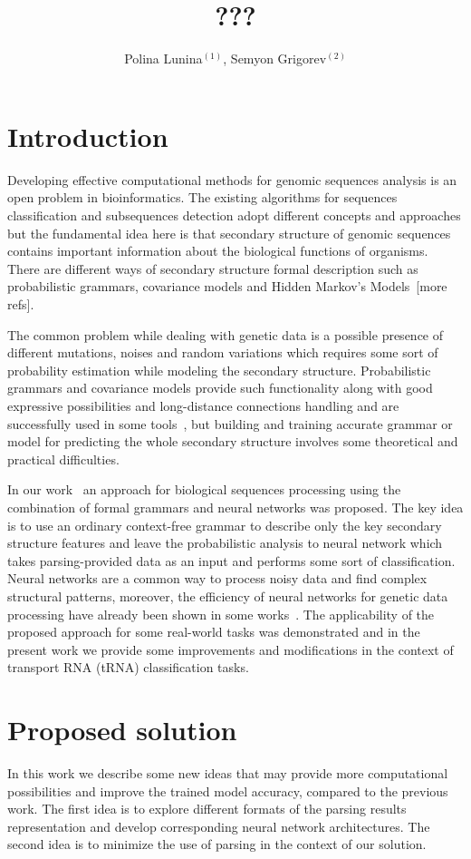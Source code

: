 \documentclass[12pt,a4paper]{cibb}
\title{\large $\ $\\ \bf ???}
\author{ Polina Lunina$^{(1)}$, Semyon Grigorev$^{(2)}$}
\begin{document}
\thispagestyle{myheadings}
\pagestyle{myheadings}



\section{\bf Introduction}
 Developing effective computational methods for genomic sequences analysis is an open problem in bioinformatics. The existing algorithms for sequences classification and subsequences detection adopt different concepts and approaches but the fundamental idea here is that secondary structure of genomic sequences contains important information about the biological functions of organisms. There are different ways of secondary structure formal description such as probabilistic grammars, covariance models and Hidden Markov’s Models~\cite{EddyDurbin}[more refs]. 

The common problem while dealing with genetic data is a possible presence of different mutations, noises and random variations which requires some sort of probability estimation while modeling the secondary structure. Probabilistic grammars and covariance models provide such functionality along with good expressive possibilities and long-distance connections handling and are successfully used in some tools~\cite{Infernal}, but building and training accurate grammar or model for predicting the whole secondary structure involves some theoretical and practical difficulties.

In our work~\cite{grigorevcomposition} an approach for biological sequences processing using the combination of formal grammars and neural networks was proposed. The key idea is to use an ordinary context-free grammar to describe only the key secondary structure features and leave the probabilistic analysis to neural network which takes parsing-provided data as an input and performs some sort of classification. Neural networks are a common way to process noisy data and find complex structural patterns, moreover, the efficiency  of neural networks for genetic data processing have already been shown in some works~\cite{Humidor,ANN}. The applicability of the proposed approach for some real-world tasks was demonstrated and in the present work we provide some improvements and modifications in the context of transport RNA (tRNA) classification tasks. 


\section{\bf Proposed solution}
In this work we describe some new ideas that may provide more computational possibilities and improve the trained model accuracy, compared to the previous work. The first idea is to explore different formats of the parsing results representation and develop corresponding neural network architectures. The second idea is to minimize the use of parsing in the context of our solution.
\end{document}
